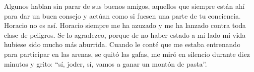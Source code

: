 Algunos hablan sin parar de sus buenos amigos, aquellos que siempre están ahí para dar un buen consejo y actúan como si fuesen una parte de tu conciencia. Horacio no es así. Horacio siempre me ha azuzado y me ha lanzado contra toda clase de peligros. Se lo agradezco, porque de no haber estado a mi lado mi vida hubiese sido mucho más aburrida. Cuando le conté que me estaba entrenando para participar en las arenas, se quitó las gafas, me miró en silencio durante diez minutos y grito: ``sí, joder, sí, vamos a ganar un montón de pasta''.